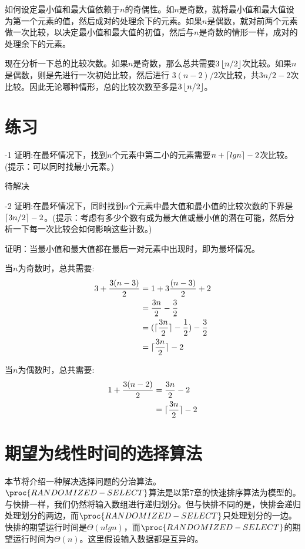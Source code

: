 \documentclass[a4paper,11pt]{ctexbook}
\begin{document}
如何设定最小值和最大值依赖于$ n $的奇偶性。如$ n $是奇数，就将最小值和最大值设为第一个元素的值，然后成对的处理余下的元素。如果$ n $是偶数，就对前两个元素做一次比较，以决定最小值和最大值的初值，然后与$ n $是奇数的情形一样，成对的处理余下的元素。

现在分析一下总的比较次数。如果$ n $是奇数，那么总共需要$ 3\left\lfloor n/2 \right\rfloor $次比较。如果$ n $是偶数，则是先进行一次初始比较，然后进行
$ 3(n-2)/2 $次比较，共$ 3n/2-2 $次比较。因此无论哪种情形，总的比较次数至多是$ 3\left\lfloor n/2 \right\rfloor $。

\section*{练习}

-1 证明:在最坏情况下，找到$ n $个元素中第二小的元素需要$ n + \lceil lgn \rceil - 2 $次比较。(提示：可以同时找最小元素。)

待解决

-2 证明:在最坏情况下，同时找到$ n $个元素中最大值和最小值的比较次数的下界是$ \lceil 3n/2 \rceil-2 $。(提示：考虑有多少个数有成为最大值或最小值的潜在可能，然后分析一下每一次比较会如何影响这些计数。)

证明：当最小值和最大值都在最后一对元素中出现时，即为最坏情况。

当$ n $为奇数时，总共需要:
\begin{equation}
\begin{split}
3+\frac{3(n-3)}{2} &= 1 + 3\frac{(n-3)}{2} + 2\\
&=\frac{3n}{2}-\frac{3}{2}\\
&=(\lceil \frac{3n}{2} \rceil-\frac{1}{2})-\frac{3}{2}\\
&=\lceil \frac{3n}{2} \rceil-2
\end{split}
\end{equation}

当$ n $为偶数时，总共需要:
\begin{equation}
\begin{split}
1+\frac{3(n-2)}{2}&=\frac{3n}{2}-2\\
&=\lceil \frac{3n}{2} \rceil-2
\end{split}
\end{equation}

\section{期望为线性时间的选择算法}

本节将介绍一种解决选择问题的分治算法。$ \proc{RANDOMIZED-SELECT} $算法是以第7章的快速排序算法为模型的。与快排一样，我们仍然将输入数组进行递归划分。但与快排不同的是，快排会递归处理划分的两边，而$ \proc{RANDOMIZED-SELECT} $只处理划分的一边。快排的期望运行时间是$ \Theta(nlgn) $，而$ \proc{RANDOMIZED-SELECT} $的期望运行时间为$ \Theta(n)$。这里假设输入数据都是互异的。
\end{document}
